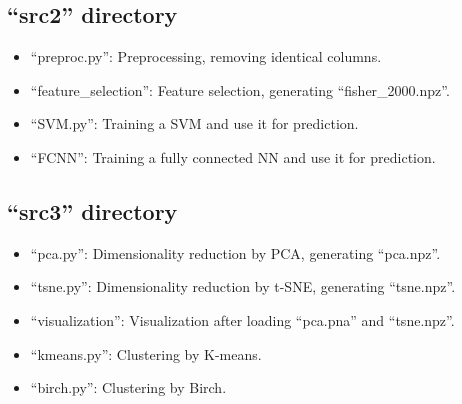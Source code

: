 \documentclass{article}
\begin{document}
{    \subsection{``src2'' directory}
    {
        \begin{itemize}
            \item ``preproc.py'': Preprocessing, removing identical columns.
            \item ``feature\_selection'': Feature selection, generating ``fisher\_2000.npz''.
            \item ``SVM.py'': Training a SVM and use it for prediction.
            \item ``FCNN'': Training a fully connected NN and use it for prediction.
        \end{itemize}
    }

    \subsection{``src3'' directory}
    {
        \begin{itemize}
            \item ``pca.py'': Dimensionality reduction by PCA, generating ``pca.npz''.
            \item ``tsne.py'': Dimensionality reduction by t-SNE, generating ``tsne.npz''.
            \item ``visualization'': Visualization after loading ``pca.pna'' and ``tsne.npz''. 
            \item ``kmeans.py'': Clustering by K-means.
            \item ``birch.py'': Clustering by Birch.
        \end{itemize}
    }
}

\clearpage
\end{document}

